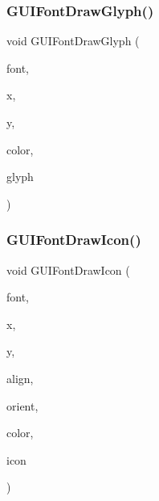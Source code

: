 \subsubsection{\texorpdfstring{G\+U\+I\+Font\+Draw\+Glyph()}{GUIFontDrawGlyph()}}
{\footnotesize\ttfamily void G\+U\+I\+Font\+Draw\+Glyph (\begin{DoxyParamCaption}\item[{const struct G\+U\+I\+Font $\ast$}]{font,  }\item[{\mbox{\hyperlink{ioapi_8h_a787fa3cf048117ba7123753c1e74fcd6}{int}}}]{x,  }\item[{\mbox{\hyperlink{ioapi_8h_a787fa3cf048117ba7123753c1e74fcd6}{int}}}]{y,  }\item[{uint32\+\_\+t}]{color,  }\item[{uint32\+\_\+t}]{glyph }\end{DoxyParamCaption})}

\mbox{\label{wii_2gui-font_8c_a89adf10a0ec4d3b2dfba92b95ab17ad5}} 
\subsubsection{\texorpdfstring{G\+U\+I\+Font\+Draw\+Icon()}{GUIFontDrawIcon()}}
{\footnotesize\ttfamily void G\+U\+I\+Font\+Draw\+Icon (\begin{DoxyParamCaption}\item[{const struct G\+U\+I\+Font $\ast$}]{font,  }\item[{\mbox{\hyperlink{ioapi_8h_a787fa3cf048117ba7123753c1e74fcd6}{int}}}]{x,  }\item[{\mbox{\hyperlink{ioapi_8h_a787fa3cf048117ba7123753c1e74fcd6}{int}}}]{y,  }\item[{enum G\+U\+I\+Alignment}]{align,  }\item[{enum G\+U\+I\+Orientation}]{orient,  }\item[{uint32\+\_\+t}]{color,  }\item[{enum G\+U\+I\+Icon}]{icon }\end{DoxyParamCaption})}

\mbox{\label{wii_2gui-font_8c_ae9ac7ef646aad8e77b04baf500472178}} 
